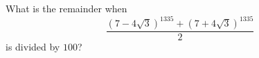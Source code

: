 What is the remainder when
\[
\dfrac{\left(7-4\sqrt3\right)^{1335}+\left(7+4\sqrt3\right)^{1335}}{2}
\]
is divided by $100$?
